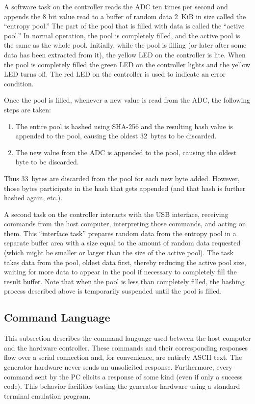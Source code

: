 A software task on the controller reads the ADC ten times per second and appends the 8 bit value
read to a buffer of random data 2~KiB in size called the ``entropy pool.'' The part of the pool
that is filled with data is called the ``active pool.'' In normal operation, the pool is
completely filled, and the active pool is the same as the whole pool. Initially, while the pool
is filling (or later after some data has been extracted from it), the yellow LED on the
controller is lite. When the pool is completely filled the green LED on the controller lights
and the yellow LED turns off. The red LED on the controller is used to indicate an error
condition.

Once the pool is filled, whenever a new value is read from the ADC, the following steps are
taken:

\begin{enumerate}
\item The entire pool is hashed using SHA-256 and the resulting hash value is appended to the
  pool, causing the oldest 32~bytes to be discarded.
\item The new value from the ADC is appended to the pool, causing the oldest byte to be
  discarded.
\end{enumerate}

Thus 33~bytes are discarded from the pool for each new byte added. However, those bytes
participate in the hash that gets appended (and that hash is further hashed again, etc.).

A second task on the controller interacts with the USB interface, receiving commands from the
host computer, interpreting those commands, and acting on them. This ``interface task'' prepares
random data from the entropy pool in a separate buffer area with a size equal to the amount of
random data requested (which might be smaller or larger than the size of the active pool). The
task takes data from the pool, oldest data first, thereby reducing the active pool size, waiting
for more data to appear in the pool if necessary to completely fill the result buffer. Note that
when the pool is less than completely filled, the hashing process described above is temporarily
suspended until the pool is filled.

\subsection{Command Language}

This subsection describes the command language used between the host computer and the hardware
controller. These commands and their corresponding responses flow over a serial connection and,
for convenience, are entirely ASCII text. The generator hardware never sends an unsolicited
response. Furthermore, every command sent by the PC elicits a response of some kind (even if
only a success code). This behavior facilities testing the generator hardware using a standard
terminal emulation program.

